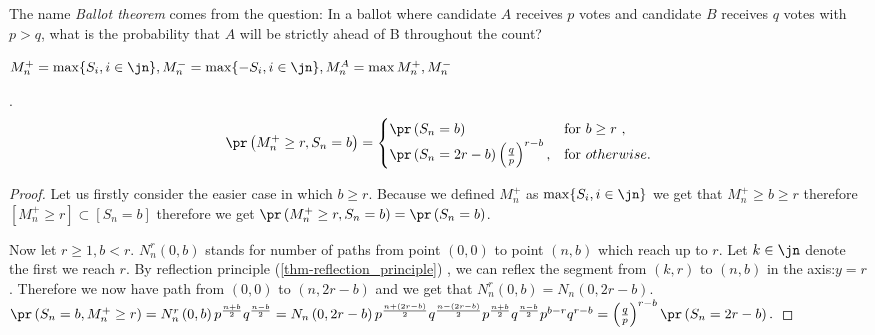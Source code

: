  \begin{rem}
   The name \textit{Ballot theorem} comes from the question: In a ballot where candidate $A$ receives $p$ votes and candidate $B$ receives $q$ votes with $p > q$, what is the probability that $A$ will be strictly ahead of B throughout the count?
 \end{rem}
\begin{defn}\label{defn-max}
 $M_n^+=\max \{S_i, i\in \jn\}, M_n^-=\max \{-S_i, i\in \jn\}, M_n^A=\max{M_n^+, M_n^-}$
\end{defn}
\begin{thm}\label{thm-probability_maximum_upto_time}
 \Lrw.
 \[\pr \left(  M_n^+\geq r, S_n=b \right) =
 \begin{cases}
 \pr \left( S_n=b \right) & \text{for $b \geq r$ },\\
 \pr \left( S_n=2r-b \right) \left( \frac{q}{p} \right) ^{r-b}, & \text{for $otherwise$}.
 \end{cases}
 \]
\end{thm}
\begin{proof}
 Let us firstly consider the easier case in which $b \geq r$. Because we defined $ M_n^+$ as $\max \{S_i, i\in \jn \}$ we get that $ M_n^+ \geq b \geq r$
 therefore $[ M_n^+ \geq r] \subset [S_n=b]$ therefore we get $\pr \left(  M_n^+\geq r, S_n=b \right) =
 \pr \left( S_n=b \right) $.

 Now let $r\geq 1, b<r$. $N_n^r \left( 0,b \right) $ stands for number of paths from point $ \left( 0,0 \right) $ to point $ \left( n,b \right) $ which reach up to $r$.
 Let $k \in \jn$ denote the first \Time we reach $r$. By reflection principle (\ref{thm-reflection_principle}) , we can reflex the segment from $\left(k,r\right)$ to $ \left( n,b \right) $ in the axis:$y=r$.
 Therefore we now have path from $ \left( 0,0 \right) $ to $ \left( n,2r-b \right) $ and we get that $N_n^r \left( 0,b \right) =N_n \left( 0,2r-b \right) $. $\pr \left( S_n=b, M_n^+\geq r \right) =N_n^r \left( 0,b \right) p^{\frac{n+b}{2}}q^{\frac{n-b}{2}}=
 N_n \left( 0,2r-b \right) p^{\frac{n+ \left( 2r-b \right) }{2}}q^{\frac{n- \left( 2r-b \right) }{2}}p^{\frac{n+b}{2}}q^{\frac{n-b}{2}}p^{b-r}q^{r-b}= \left( \frac{q}{p} \right) ^{r-b}\pr \left( S_n=2r-b \right).$
\end{proof}

